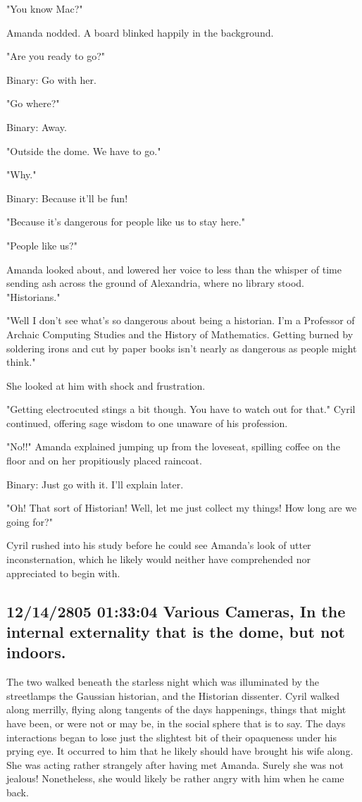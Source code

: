 \documentclass[12pt]{article}
\begin{document}
"You know Mac?"

Amanda nodded. A board blinked happily in the background.

"Are you ready to go?"

Binary: Go with her.

"Go where?"

Binary: Away.

"Outside the dome. We have to go."

"Why."

Binary: Because it'll be fun!

"Because it's dangerous for people like us to stay here."

"People like us?"

Amanda looked about, and lowered her voice to less than the whisper of time sending ash across the ground of Alexandria, where no library stood. "Historians."

"Well I don't see what's so dangerous about being a historian. I'm a Professor of Archaic Computing Studies and the History of Mathematics. Getting burned by soldering irons and cut by paper books isn't nearly as dangerous as people might think."

She looked at him with shock and frustration.

"Getting electrocuted stings a bit though. You have to watch out for that." Cyril continued, offering sage wisdom to one unaware of his profession.

"No!!" Amanda explained jumping up from the loveseat, spilling coffee on the floor and on her propitiously placed raincoat.

Binary: Just go with it. I'll explain later.

"Oh! That sort of Historian! Well, let me just collect my things! How long are we going for?"

Cyril rushed into his study before he could see Amanda's look of utter inconsternation, which he likely would neither have comprehended nor appreciated to begin with.

\subsection*{12/14/2805 01:33:04 Various Cameras, In the internal externality that is the dome, but not indoors.}
\label{sec:orgfe4c5ce}

The two walked beneath the starless night which was illuminated by the streetlamps the Gaussian historian, and the Historian dissenter. Cyril walked along merrilly, flying along tangents of the days happenings, things that might have been, or were not or may be, in the social sphere that is to say. The days interactions began to lose just the slightest bit of their opaqueness under his prying eye. It occurred to him that he likely should have brought his wife along. She was acting rather strangely after having met Amanda. Surely she was not jealous! Nonetheless, she would likely be rather angry with him when he came back.
\end{document}

